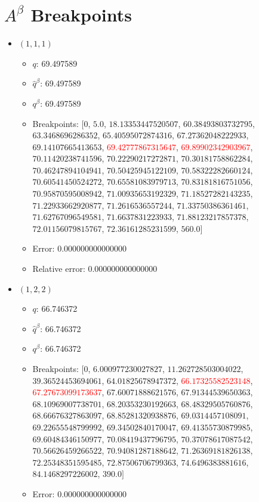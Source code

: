 \documentclass{article}%
\begin{document}
\section{$A^\beta$ Breakpoints}%
\thispagestyle{plain}%
\begin{itemize}%
	\item $(1, 1, 1)$%
	\begin{itemize}%
		\item $q$: 69.497589%
		\item $\hat{q}^\beta$: 69.497589%
		\item $q^\beta$: 69.497589%
		\item Breakpoints: $[$$0$, $5.0$, $18.13353447520507$, $60.38493803732795$, $63.3468696286352$, $65.40595072874316$, $67.27362048222933$, $69.14107665413653$, \textcolor{red}{$69.42777867315647$}, \textcolor{red}{$69.89902342903967$}, $70.11420238741596$, $70.22290217272871$, $70.30181758862284$, $70.46247894104941$, $70.50425945122109$, $70.58322282660124$, $70.60541450524272$, $70.65581083979713$, $70.83181816751056$, $70.95870595008942$, $71.00935653192329$, $71.18527282143235$, $71.22933662920877$, $71.2616536557244$, $71.33750386361461$, $71.62767096549581$, $71.6637831223933$, $71.88123217857378$, $72.01156079815767$, $72.36161285231599$, $560.0$$]$%
		\item Error: 0.000000000000000%
		\item Relative error: 0.000000000000000%
	\end{itemize}%
	\item $(1, 2, 2)$%
	\begin{itemize}%
		\item $q$: 66.746372%
		\item $\hat{q}^\beta$: 66.746372%
		\item $q^\beta$: 66.746372%
		\item Breakpoints: $[$$0$, $6.000977230027827$, $11.262728503004022$, $39.36524453694061$, $64.01825678947372$, \textcolor{red}{$66.17325582523148$}, \textcolor{red}{$67.27673099173637$}, $67.60071888621576$, $67.91344539650363$, $68.10969007738701$, $68.20353230192663$, $68.48329505760876$, $68.66676327863097$, $68.85281320938876$, $69.0314457108091$, $69.22655548799992$, $69.34502840170047$, $69.41355730879985$, $69.60484346150977$, $70.08419437796795$, $70.37078617087542$, $70.56626459266522$, $70.94081287188642$, $71.26369181826138$, $72.25348351595485$, $72.87506706799363$, $74.6496383881616$, $84.1468297226002$, $390.0$$]$%
		\item Error: 0.000000000000000%

\end{itemize}
\end{itemize}
\end{document}
